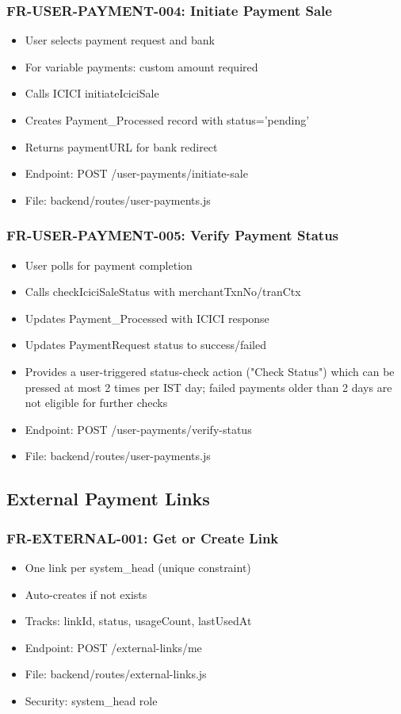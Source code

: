\documentclass[12pt,a4paper]{article}
\begin{document}
\subsubsection{FR-USER-PAYMENT-004: Initiate Payment Sale}
\begin{itemize}
  \item User selects payment request and bank
  \item For variable payments: custom amount required
  \item Calls ICICI initiateIciciSale
  \item Creates Payment\_Processed record with status='pending'
  \item Returns paymentURL for bank redirect
  \item Endpoint: POST /user-payments/initiate-sale
  \item File: backend/routes/user-payments.js
\end{itemize}

\subsubsection{FR-USER-PAYMENT-005: Verify Payment Status}
\begin{itemize}
  \item User polls for payment completion
  \item Calls checkIciciSaleStatus with merchantTxnNo/tranCtx
  \item Updates Payment\_Processed with ICICI response
  \item Updates PaymentRequest status to success/failed
  \item Provides a user-triggered status-check action ("Check Status") which can be pressed at most 2 times per IST day; failed payments older than 2 days are not eligible for further checks
  \item Endpoint: POST /user-payments/verify-status
  \item File: backend/routes/user-payments.js
\end{itemize}

\subsection{External Payment Links}

\subsubsection{FR-EXTERNAL-001: Get or Create Link}
\begin{itemize}
  \item One link per system\_head (unique constraint)
  \item Auto-creates if not exists
  \item Tracks: linkId, status, usageCount, lastUsedAt
  \item Endpoint: POST /external-links/me
  \item File: backend/routes/external-links.js
  \item Security: system\_head role
\end{itemize}
\end{document}
